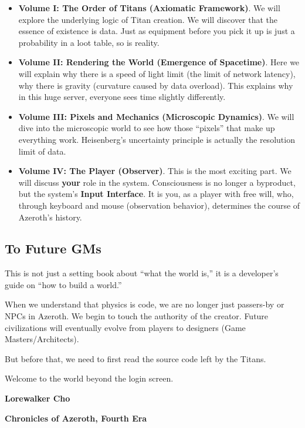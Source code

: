 \begin{itemize}
\item \textbf{Volume I: The Order of Titans (Axiomatic Framework)}. We will explore the underlying logic of Titan creation. We will discover that the essence of existence is data. Just as equipment before you pick it up is just a probability in a loot table, so is reality.

\item \textbf{Volume II: Rendering the World (Emergence of Spacetime)}. Here we will explain why there is a speed of light limit (the limit of network latency), why there is gravity (curvature caused by data overload). This explains why in this huge server, everyone sees time slightly differently.

\item \textbf{Volume III: Pixels and Mechanics (Microscopic Dynamics)}. We will dive into the microscopic world to see how those ``pixels'' that make up everything work. Heisenberg's uncertainty principle is actually the resolution limit of data.

\item \textbf{Volume IV: The Player (Observer)}. This is the most exciting part. We will discuss \textbf{your} role in the system. Consciousness is no longer a byproduct, but the system's \textbf{Input Interface}. It is you, as a player with free will, who, through keyboard and mouse (observation behavior), determines the course of Azeroth's history.
\end{itemize}

\subsection*{To Future GMs}

This is not just a setting book about ``what the world is,'' it is a developer's guide on ``how to build a world.''

When we understand that physics is code, we are no longer just passers-by or NPCs in Azeroth. We begin to touch the authority of the creator. Future civilizations will eventually evolve from players to designers (Game Masters/Architects).

But before that, we need to first read the source code left by the Titans.

Welcome to the world beyond the login screen.

\textbf{Lorewalker Cho}

\textbf{Chronicles of Azeroth, Fourth Era}
